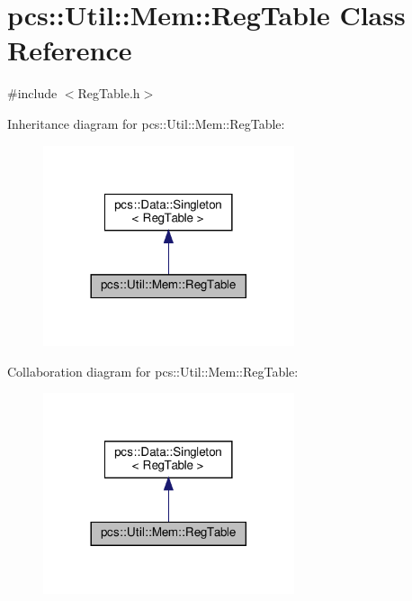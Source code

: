 \hypertarget{classpcs_1_1Util_1_1Mem_1_1RegTable}{}\section{pcs\+:\+:Util\+:\+:Mem\+:\+:Reg\+Table Class Reference}
\label{classpcs_1_1Util_1_1Mem_1_1RegTable}


{\ttfamily \#include $<$Reg\+Table.\+h$>$}



Inheritance diagram for pcs\+:\+:Util\+:\+:Mem\+:\+:Reg\+Table\+:\nopagebreak
\begin{figure}[H]
\begin{center}
\leavevmode
\includegraphics[width=209pt]{classpcs_1_1Util_1_1Mem_1_1RegTable__inherit__graph}
\end{center}
\end{figure}


Collaboration diagram for pcs\+:\+:Util\+:\+:Mem\+:\+:Reg\+Table\+:\nopagebreak
\begin{figure}[H]
\begin{center}
\leavevmode
\includegraphics[width=209pt]{classpcs_1_1Util_1_1Mem_1_1RegTable__coll__graph}
\end{center}
\end{figure}
